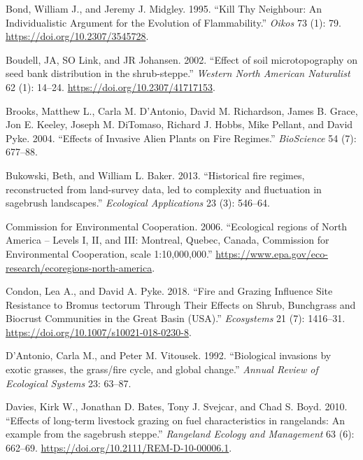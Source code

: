 \documentclass[
  12pt,
]{article}
\newlength{\cslhangindent}
\newlength{\cslentryspacingunit} %
\newenvironment{CSLReferences}[2] %
 {%
  \setlength{\parindent}{0pt}
  \ifodd #1
  \let\oldpar\par
  \def\par{\hangindent=\cslhangindent\oldpar}
  \fi
  \setlength{\parskip}{#2\cslentryspacingunit}
 }%
 {}
\begin{document}
\begin{CSLReferences}{1}{0}
\leavevmode{}%
Bond, William J., and Jeremy J. Midgley. 1995. {``{Kill Thy Neighbour:
An Individualistic Argument for the Evolution of Flammability}.''}
\emph{Oikos} 73 (1): 79. \url{https://doi.org/10.2307/3545728}.

\leavevmode{}%
Boudell, JA, SO Link, and JR Johansen. 2002. {``{Effect of soil
microtopography on seed bank distribution in the shrub-steppe}.''}
\emph{Western North American Naturalist} 62 (1): 14--24.
\url{https://doi.org/10.2307/41717153}.

\leavevmode{}%
Brooks, Matthew L., Carla M. D'Antonio, David M. Richardson, James B.
Grace, Jon E. Keeley, Joseph M. DiTomaso, Richard J. Hobbs, Mike
Pellant, and David Pyke. 2004. {``{Effects of Invasive Alien Plants on
Fire Regimes}.''} \emph{BioScience} 54 (7): 677--88.

\leavevmode{}%
Bukowski, Beth, and William L. Baker. 2013. {``{Historical fire regimes,
reconstructed from land-survey data, led to complexity and fluctuation
in sagebrush landscapes}.''} \emph{Ecological Applications} 23 (3):
546--64.

\leavevmode{}%
Commission for Environmental Cooperation. 2006. {``{Ecological regions
of North America -- Levels I, II, and III: Montreal, Quebec, Canada,
Commission for Environmental Cooperation, scale 1:10,000,000}.''}
\url{https://www.epa.gov/eco-research/ecoregions-north-america}.

\leavevmode{}%
Condon, Lea A., and David A. Pyke. 2018. {``{Fire and Grazing Influence
Site Resistance to Bromus tectorum Through Their Effects on Shrub,
Bunchgrass and Biocrust Communities in the Great Basin (USA)}.''}
\emph{Ecosystems} 21 (7): 1416--31.
\url{https://doi.org/10.1007/s10021-018-0230-8}.

\leavevmode{}%
D'Antonio, Carla M., and Peter M. Vitousek. 1992. {``{Biological
invasions by exotic grasses, the grass/fire cycle, and global
change}.''} \emph{Annual Review of Ecological Systems} 23: 63--87.

\leavevmode{}%
Davies, Kirk W., Jonathan D. Bates, Tony J. Svejcar, and Chad S. Boyd.
2010. {``{Effects of long-term livestock grazing on fuel characteristics
in rangelands: An example from the sagebrush steppe}.''} \emph{Rangeland
Ecology and Management} 63 (6): 662--69.
\url{https://doi.org/10.2111/REM-D-10-00006.1}.


\end{CSLReferences}
\end{document}
